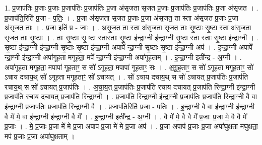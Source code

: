 \documentclass[17pt]{extarticle}
\begin{document}
1. प्र॒जाप॑तिः प्र॒जाः प्र॒जाः प्र॒जाप॑तिः प्र॒जाप॑तिः प्र॒जा अ॑सृजता सृजत प्र॒जाः प्र॒जाप॑तिः प्र॒जाप॑तिः प्र॒जा अ॑सृजत । . प्र॒जाप॑ति॒रिति॑ प्र॒जा - प॒तिः॒ । . प्र॒जा अ॑सृजता सृजत प्र॒जाः प्र॒जा अ॑सृजत॒ ता स्ता अ॑सृजत प्र॒जाः प्र॒जा अ॑सृजत॒ ताः । . प्र॒जा इति॑ प्र - जाः । . अ॒सृ॒ज॒त॒ ता स्ता अ॑सृजता सृजत॒ ताः सृ॒ष्टाः सृ॒ष्टा स्ता अ॑सृजता सृजत॒ ताः सृ॒ष्टाः । . ताः सृ॒ष्टाः सृ॒ ष्टा स्तास्ताः सृ॒ष्टा इ॑न्द्रा॒ग्नी इ॑न्द्रा॒ग्नी सृ॒ष्टा स्ता स्ताः सृ॒ष्टा इ॑न्द्रा॒ग्नी । . सृ॒ष्टा इ॑न्द्रा॒ग्नी इ॑न्द्रा॒ग्नी सृ॒ष्टाः सृ॒ष्टा इ॑न्द्रा॒ग्नी अपापे᳚ न्द्रा॒ग्नी सृ॒ष्टाः सृ॒ष्टा इ॑न्द्रा॒ग्नी अप॑ । . इ॒न्द्रा॒ग्नी अपापे᳚ न्द्रा॒ग्नी इ॑न्द्रा॒ग्नी अपा॑गूहता मगूहता॒ मपे᳚ न्द्रा॒ग्नी इ॑न्द्रा॒ग्नी अपा॑गूहताम् । . इ॒न्द्रा॒ग्नी इती᳚न्द्र - अ॒ग्नी । . अपा॑गूहता मगूहता॒ मपापा॑ गूहताꣳ॒॒ स सो॑ ऽगूहता॒ मपापा॑ गूहताꣳ॒॒ सः । . अ॒गू॒ह॒ताꣳ॒॒ स सो॑ ऽगूहता मगूहताꣳ॒॒ सो॑ ऽचाय दचाय॒थ् सो॑ ऽगूहता मगूहताꣳ॒॒ सो॑ ऽचायत् । . सो॑ ऽचाय दचाय॒थ् स सो॑ ऽचायत् प्र॒जाप॑तिः प्र॒जाप॑ति रचाय॒थ् स सो॑ ऽचायत् प्र॒जाप॑तिः । . अ॒चा॒य॒त् प्र॒जाप॑तिः प्र॒जाप॑ति रचाय दचायत् प्र॒जाप॑ति रिन्द्रा॒ग्नी इ॑न्द्रा॒ग्नी प्र॒जाप॑ति रचाय दचायत् प्र॒जाप॑ति रिन्द्रा॒ग्नी । . प्र॒जाप॑ति रिन्द्रा॒ग्नी इ॑न्द्रा॒ग्नी प्र॒जाप॑तिः प्र॒जाप॑ति रिन्द्रा॒ग्नी वै वा इ॑न्द्रा॒ग्नी प्र॒जाप॑तिः प्र॒जाप॑ति रिन्द्रा॒ग्नी वै । . प्र॒जाप॑ति॒रिति॑ प्र॒जा - प॒तिः॒ । . इ॒न्द्रा॒ग्नी वै वा इ॑न्द्रा॒ग्नी इ॑न्द्रा॒ग्नी वै मे॑ मे॒ वा इ॑न्द्रा॒ग्नी इ॑न्द्रा॒ग्नी वै मे᳚ । . इ॒न्द्रा॒ग्नी इती᳚न्द्र - अ॒ग्नी । . वै मे॑ मे॒ वै वै मे᳚ प्र॒जाः प्र॒जा मे॒ वै वै मे᳚ प्र॒जाः । . मे॒ प्र॒जाः प्र॒जा मे॑ मे प्र॒जा अपाप॑ प्र॒जा मे॑ मे प्र॒जा अप॑ । . प्र॒जा अपाप॑ प्र॒जाः प्र॒जा अपा॑घुक्षता मघुक्षता॒ मप॑ प्र॒जाः प्र॒जा अपा॑घुक्षताम् । \newline
\end{document}
